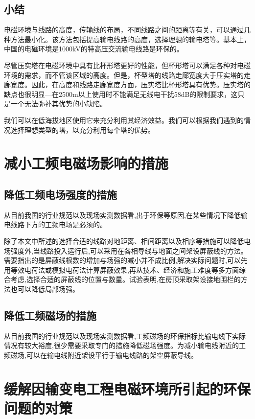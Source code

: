 \documentclass{ctexart} %
\begin{document}
\subsection{小结}
电磁环境与线路的高度，传输线的布局，不同线路之间的距离等有关，可以通过几种方法最小化。该方法包括提高输电线路的高度，选择理想的输电塔等。基本上，中国的电磁环境是1000kV的特高压交流输电线路是环保的。

尽管压实塔在电磁环境中具有比杯形塔更好的性能，但杯形塔可以满足各种对电磁环境的需求，而不管该区域的高度。但是，杯型塔的线路走廊宽度大于压实塔的走廊宽度。因此，在高度和线路走廊宽度方面，压实塔比杯形塔具有优势。压实塔的缺点也很明显---在2500m以上使用时不能满足无线电干扰58dB的限制要求，这只是一个无法弥补其优势的小缺陷。

我们可以在低海拔地区使用它来充分利用其经济效益。我们可以根据我们遇到的情况选择理想类型的塔，以充分利用每个塔的优势。


\section{减小工频电磁场影响的措施}

\subsection{降低工频电场强度的措施}

从目前我国的行业规范以及现场实测数据看,出于环保等原因,在某些情况下降低输电线路下方的工频电场是必须的。

除了本文中所述的选择合适的线路对地距离、相间距离以及相序等措施可以降低电场强度外,当线路投入运行后,可以采用在各相导线与地面之间架设屏蔽线的方法。需要指出的是屏蔽线根数的增加与场强的减小并不成比例,解决实际问题时,可以先用等效电荷法或模拟电荷法计算屏蔽效果,再从技术、经济和施工难度等多方面综合考虑,选择合适的屏蔽线的位置与数量。试验表明,在房顶采取架设接地围栏的方法也可以降低局部场强。

\subsection{降低工频磁场的措施}

从目前我国的行业规范以及现场实测数据看,工频磁场的环保指标比输电线下实际情况有较大裕度,很少需要采取专门的措施降低磁场强度。为减小输电线附近的工频磁场,可以在输电线附近架设平行于输电线路的架空屏蔽导线。

\section{缓解因输变电工程电磁环境所引起的环保问题的对策}
\end{document}
